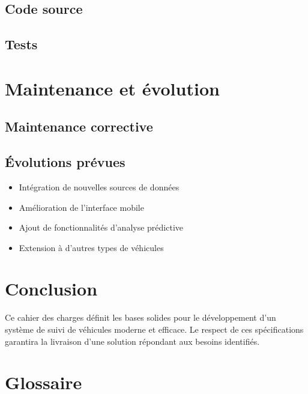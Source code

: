 \documentclass[12pt,a4paper]{article}
\begin{document}
\subsection{Code source}

\lipsum[18]

\subsection{Tests}

\lipsum[19]

\section{Maintenance et évolution}

\subsection{Maintenance corrective}

\lipsum[20]

\subsection{Évolutions prévues}

\begin{itemize}
    \item Intégration de nouvelles sources de données
    \item Amélioration de l'interface mobile
    \item Ajout de fonctionnalités d'analyse prédictive
    \item Extension à d'autres types de véhicules
\end{itemize}

\section{Conclusion}

\lipsum[21-22]

Ce cahier des charges définit les bases solides pour le développement d'un système de suivi de véhicules moderne et efficace. Le respect de ces spécifications garantira la livraison d'une solution répondant aux besoins identifiés.

\newpage
\appendix

\section{Glossaire}
\end{document}
